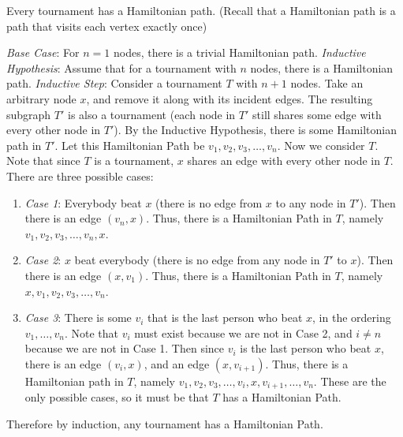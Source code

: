 \question Every tournament has a Hamiltonian path. 
(Recall that a Hamiltonian path is a path that visits each vertex 
exactly once)

\begin{solution}
\textit{Base Case}: For $n = 1$ nodes, there is a trivial 
Hamiltonian path. \newline
\textit{Inductive Hypothesis}: Assume that for a tournament 
with $n$ nodes, there is a Hamiltonian path.\newline
\textit{Inductive Step}: Consider a tournament $T$ with $n + 1$ nodes. 
Take an arbitrary node $x$, and remove it along with its incident 
edges. The resulting subgraph $T$\ensuremath{'} is also a tournament 
(each node in $T$\ensuremath{'} still shares some edge with every 
other node in $T$\ensuremath{'}). By the Inductive Hypothesis, 
there is some Hamiltonian path in $T$\ensuremath{'}. Let this 
Hamiltonian Path be $v_1, v_2, v_3, \dotsc , v_n$. Now we consider 
$T$. Note that since $T$ is a tournament, $x$ shares an edge with 
every other node in $T$. There are three possible cases:
\begin{enumerate}[label= ]
	\item \textit{Case 1}: Everybody beat $x$ (there is no edge 
	from $x$ to any node in $T$\ensuremath{'}). Then there is an 
	edge $(v_n, x)$. Thus, there is a Hamiltonian Path in $T$, 
	namely $v_1, v_2, v_3, \dotsc, v_n, x$.
	\item \textit{Case 2}: $x$ beat everybody (there is no edge 
	from any node in $T$\ensuremath{'} to $x$). Then there is an 
	edge $(x, v_1)$. Thus, there is a Hamiltonian Path in $T$, 
	namely $x, v_1, v_2, v_3, \dotsc , v_n$.
	 \item \textit{Case 3}: There is some $v_i$ that is the last 
	 person who beat $x$, in the ordering $v_1, \dotsc , v_n$. 
	 Note that $v_i$ must exist because we are not in Case 2, and 
	 $i \neq n$ because we are not in Case 1. Then since $v_i$ is 
	 the last person who beat $x$, there is an edge $(v_i, x)$, and 
	 an edge $(x, v_{i+1})$. Thus, there is a Hamiltonian path in $T$, 
	 namely $v_1, v_2, v_3, \dotsc , v_i, x, v_{i+1}, \dotsc , v_n$.
These are the only possible cases, so it must be that $T$ has a Hamiltonian Path.
\end{enumerate}
Therefore by induction, any tournament has a Hamiltonian Path. \newline

\end{solution}

\clearpage